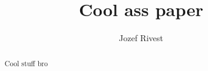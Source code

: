 \documentclass[12pt]{article}
\title{Cool ass paper}
\author{Jozef Rivest}
\begin{document}
\maketitle
\begin{abstract}
	Cool stuff bro
\end{abstract}



\end{document}
